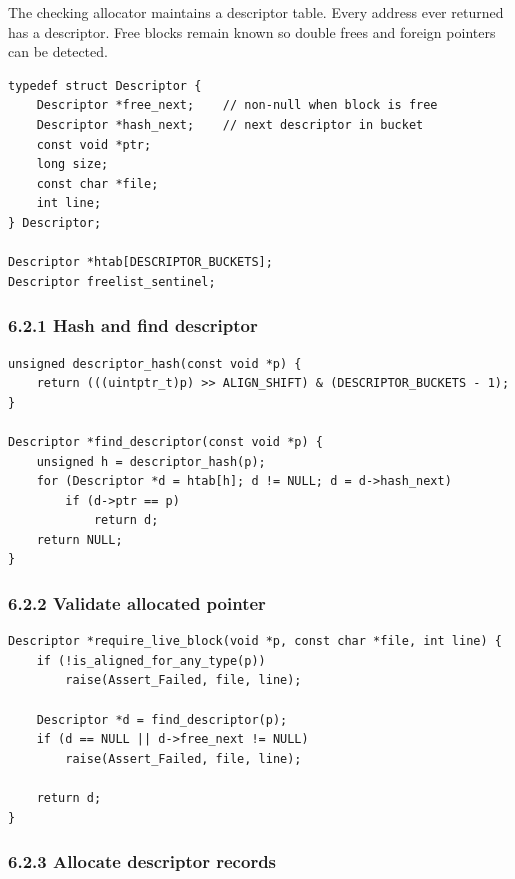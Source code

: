 \documentclass[11pt]{article}
\begin{document}
The checking allocator maintains a descriptor table. Every address ever returned has a descriptor. Free blocks remain known so double frees and foreign pointers can be detected.

\begin{verbatim}
typedef struct Descriptor {
    Descriptor *free_next;    // non-null when block is free
    Descriptor *hash_next;    // next descriptor in bucket
    const void *ptr;
    long size;
    const char *file;
    int line;
} Descriptor;

Descriptor *htab[DESCRIPTOR_BUCKETS];
Descriptor freelist_sentinel;
\end{verbatim}

\subsubsection{6.2.1 Hash and find descriptor}\label{hash-and-find-descriptor}

\begin{verbatim}
unsigned descriptor_hash(const void *p) {
    return (((uintptr_t)p) >> ALIGN_SHIFT) & (DESCRIPTOR_BUCKETS - 1);
}

Descriptor *find_descriptor(const void *p) {
    unsigned h = descriptor_hash(p);
    for (Descriptor *d = htab[h]; d != NULL; d = d->hash_next)
        if (d->ptr == p)
            return d;
    return NULL;
}
\end{verbatim}

\subsubsection{6.2.2 Validate allocated pointer}\label{validate-allocated-pointer}

\begin{verbatim}
Descriptor *require_live_block(void *p, const char *file, int line) {
    if (!is_aligned_for_any_type(p))
        raise(Assert_Failed, file, line);

    Descriptor *d = find_descriptor(p);
    if (d == NULL || d->free_next != NULL)
        raise(Assert_Failed, file, line);

    return d;
}
\end{verbatim}

\subsubsection{6.2.3 Allocate descriptor records}\label{allocate-descriptor-records}
\end{document}
